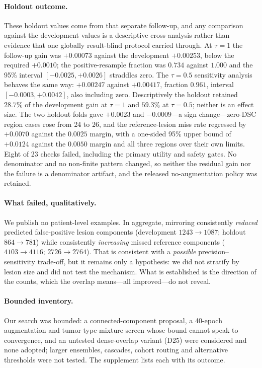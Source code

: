 \documentclass[runningheads]{llncs}
\begin{document}
\paragraph{Holdout outcome.} These holdout values come from that separate follow-up, and any
comparison against the development values is a descriptive cross-analysis rather than evidence that
one globally result-blind protocol carried through. At $\tau=1$ the follow-up gain was $+0.00073$
against the development $+0.00253$, below the
required $+0.0010$; the positive-resample fraction was $0.734$ against $1.000$ and the 95\% interval
$[-0.0025,+0.0026]$ straddles zero. The $\tau=0.5$ sensitivity analysis behaves the same way:
$+0.00247$ against $+0.00417$, fraction $0.961$, interval $[-0.0003,+0.0042]$, also including zero.
Descriptively the holdout retained $28.7\%$ of the development gain at $\tau=1$ and $59.3\%$ at
$\tau=0.5$; neither is an effect size. The two holdout folds gave $+0.0023$ and
$-0.0009$---a sign change---zero-DSC region cases rose from 24 to 26, and the reference-lesion miss
rate regressed by $+0.0070$ against the $0.0025$ margin, with a one-sided 95\% upper bound of
$+0.0124$ against the $0.0050$ margin and all three regions over their own limits. Eight of 23 checks
failed, including the primary utility and safety gates. No denominator and no non-finite pattern
changed, so neither the residual gain nor the failure is a denominator artifact, and the released
no-augmentation policy was retained.

\paragraph{What failed, qualitatively.} We publish no patient-level examples. In aggregate,
mirroring consistently \emph{reduced} predicted false-positive lesion components (development
$1243\rightarrow1087$; holdout $864\rightarrow781$) while consistently \emph{increasing} missed
reference components ($4103\rightarrow4116$; $2726\rightarrow2764$). That is consistent with a
\emph{possible} precision--sensitivity trade-off, but it remains only a hypothesis: we did not
stratify by lesion size and did not test the mechanism. What is established is the direction of the counts, which the overlap means---all improved---do not
reveal.

\paragraph{Bounded inventory.} Our search was bounded: a connected-component proposal, a 40-epoch
augmentation and tumor-type-mixture screen whose bound cannot speak to convergence, and an untested
dense-overlap variant (D25) were considered and none adopted; larger ensembles, cascades, cohort
routing and alternative thresholds were not tested. The supplement lists each with its outcome.
\end{document}
